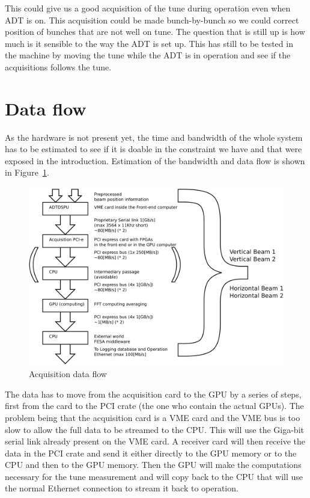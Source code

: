 	This could give us a good acquisition of the tune during operation even when \gls{ADT} is on. This acquisition could be made bunch-by-bunch so we could correct position of bunches that are not well on tune. The question that is still up is how much is it sensible to the way the \gls{ADT} is set up. This has still to be tested in the machine by moving the tune while the \gls{ADT} is in operation and see if the acquisitions follows the tune.

\section{Data flow}

As the hardware is not present yet, the time and bandwidth of the whole system has to be estimated to see if it is doable in the constraint we have and that were exposed in the introduction. Estimation of the bandwidth and data flow is shown in Figure~\ref{fig:data_flow}.

\begin{figure}[H]
\caption{Acquisition data flow}
\label{fig:data_flow}
\centering
\includegraphics[scale=0.3]{dataflow.pdf}
\end{figure}

The data has to move from the acquisition card to the GPU by a series of steps, first from the card to the PCI crate (the one who contain the actual \glspl{GPU}). The problem being that the acquisition card is a \gls{VME} card and the VME bus is too slow to allow the full data to be streamed to the CPU. This will use the Giga-bit serial link already present on the VME card. A receiver card will then receive the data in the PCI crate and send it either directly to the \gls{GPU} memory or to the \gls{CPU} and then to the \gls{GPU} memory. Then the \gls{GPU} will make the computations necessary for the tune measurement and will copy back to the \gls{CPU} that will use the normal Ethernet connection to stream it back to operation.

